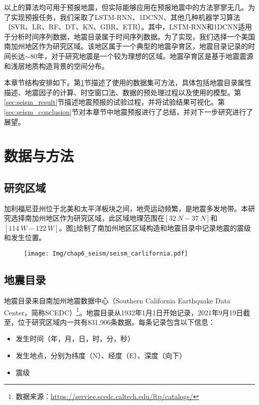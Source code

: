 以上的算法均可用于预报地震，但实际能够应用在预报地震中的方法寥寥无几。为了实现预报任务，我们采取了LSTM-RNN\citep{Wang2017Earthquake,Bhatia2018EARTHQUAKE,berhich2020lstm}、1DCNN、其他几种机器学习算法（SVR、LR、RF、DT、KN、GBR、ETR）。其中，LSTM-RNN和1DCNN适用于分析时间序列数据，地震目录属于时间序列数据\citep{Morales2010Pattern,Werner2009High}。为了实现，我们选择一个美国南加州地区作为研究区域。该地区属于一个典型的地震孕育区，地震目录记录的时间长达$\sim$80年，对于研究地震是一个较为理想的区域。地震孕育区是基于地震震源和浅层地质构造背景的空间分布。

本章节结构安排如下。第\ref{sec:seism_data_method}节描述了使用的数据集可方法，具体包括地震目录属性描述、地震因子的计算、时空窗口法、数据的预处理过程以及使用的模型。第\ref{sec:seism_result}节描述地震预报的试验过程，并将试验结果可视化。第\ref{sec:seism_conclusion}节对本章节中地震预报进行了总结，并对下一步研究进行了展望。

\section{数据与方法}\label{sec:seism_data_method}

\subsection{研究区域}\label{sec:seism_area}

加利福尼亚州位于北美和太平洋板块之间，地壳运动频繁，是地震多发地带。本研究选择南加州地区作为研究区域，此区域地理范围在$[\SI{32}{N}-\SI{37}{N}]$和$[\SI{114}{W}-\SI{122}{W}]$。图\ref{fig:seism_california}绘制了南加州地区区域构造和地震目录中记录地震的震级和发生位置。

\begin{figure}[!htbp]
  \centering
  \texttt{[image: Img/chap6\_seism/seism\_carlifornia.pdf]}
  \label{fig:seism_california}
\end{figure}

\subsection{地震目录}\label{sec:seism_catolog}

地震目录来自南加州地震数据中心（Southern California Earthquake Data Center，简称SCEDC）\footnote{数据来源：\href{https://service.scedc.caltech.edu/ftp/catalogs/}{https://service.scedc.caltech.edu/ftp/catalogs/}}。地震目录从1932年1月1日开始记录，2021年9月19日截至，位于研究区域内一共有831,906条数据。每条记录包含以下信息：
\begin{itemize}
  \item[1] 发生时间（年，月，日，时，分，秒）
  \item[2] 发生地点，分别为纬度（N）、经度（E）、深度（向下）
  \item[3] 震级
\end{itemize}

